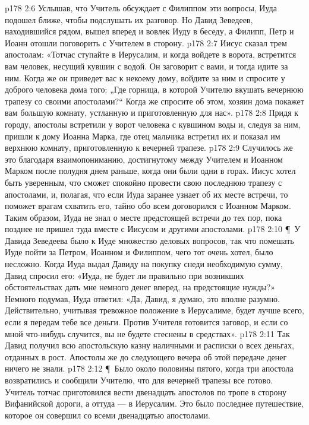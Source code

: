 \vs p178 2:6 Услышав, что Учитель обсуждает с Филиппом эти вопросы, Иуда подошел ближе, чтобы подслушать их разговор. Но Давид Зеведеев, находившийся рядом, вышел вперед и вовлек Иуду в беседу, а Филипп, Петр и Иоанн отошли поговорить с Учителем в сторону.
\vs p178 2:7 Иисус сказал трем апостолам: «Тотчас ступайте в Иерусалим, и когда войдете в ворота, встретится вам человек, несущий кувшин с водой. Он заговорит с вами, и тогда идите за ним. Когда же он приведет вас к некоему дому, войдите за ним и спросите у доброго человека дома того: „Где горница, в которой Учителю вкушать вечернюю трапезу со своими апостолами?“ Когда же спросите об этом, хозяин дома покажет вам большую комнату, устланную и приготовленную для нас».
\vs p178 2:8 Придя к городу, апостолы встретили у ворот человека с кувшином воды и, следуя за ним, пришли к дому Иоанна Марка, где отец мальчика встретил их и показал им верхнюю комнату, приготовленную к вечерней трапезе.
\vs p178 2:9 Случилось же это благодаря взаимопониманию, достигнутому между Учителем и Иоанном Марком после полудня днем раньше, когда они были одни в горах. Иисус хотел быть уверенным, что сможет спокойно провести свою последнюю трапезу с апостолами, и, полагая, что если Иуда заранее узнает об их месте встречи, то поможет врагам схватить его, тайно обо всем договорился с Иоанном Марком. Таким образом, Иуда не знал о месте предстоящей встречи до тех пор, пока позднее не пришел туда вместе с Иисусом и другими апостолами.
\vs p178 2:10 \P\ У Давида Зеведеева было к Иуде множество деловых вопросов, так что помешать Иуде пойти за Петром, Иоанном и Филиппом, чего тот очень хотел, было несложно. Когда Иуда выдал Давиду на покупку снеди необходимую сумму, Давид спросил его: «Иуда, не будет ли правильно при возникших обстоятельствах дать мне немного денег вперед, на предстоящие нужды?» Немного подумав, Иуда ответил: «Да, Давид, я думаю, это вполне разумно. Действительно, учитывая тревожное положение в Иерусалиме, будет лучше всего, если я передам тебе все деньги. Против Учителя готовится заговор, и если со мной что\hyp{}нибудь случится, вы не будете стеснены в средствах».
\vs p178 2:11 Так Давид получил всю апостольскую казну наличными и расписки о всех деньгах, отданных в рост. Апостолы же до следующего вечера об этой передаче денег ничего не знали.
\vs p178 2:12 \P\ Было около половины пятого, когда три апостола возвратились и сообщили Учителю, что для вечерней трапезы все готово. Учитель тотчас приготовился вести двенадцать апостолов по тропе в сторону Вифанийской дороги, а оттуда --- в Иерусалим. Это было последнее путешествие, которое он совершил со всеми двенадцатью апостолами.
